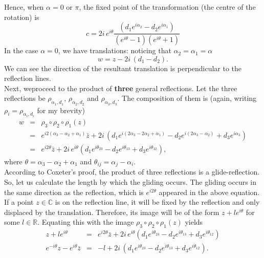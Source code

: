\documentclass{article}
\begin{document}
Hence, when $\alpha = 0$ or $\pi$, the fixed point of the transformation (the centre of the rotation) is
\begin{equation}
c =  2i \, e^{i\theta}\frac{( d_{1} e^{i\alpha_{2}} - d_{2} e^{i\alpha_{1}}) }{(e^{i\theta} - 1)(e^{i\theta} + 1)} \nonumber 
\end{equation}
In the case $\alpha = 0$, we have translations: noticing that $\alpha_{2} = \alpha_{1} = \alpha$ 
\begin{equation}
w = z - 2i \,( d_{1} - d_{2}).
\end{equation}
We can see the direction of the resultant translation is perpendicular to the reflection lines.\\
Next, weproceed to the product of \textbf{three} general reflections. Let the three reflections be $\rho_{\alpha_{1}, d_{1}}$, $\rho_{\alpha_{2},d_{2}}$ and $\rho_{\alpha_{3},d_{3}}$.
The composition of them is (again, writing $\rho_{i} = \rho_{\alpha_{i}, d_{i}}$ for my brevity)
\begin{eqnarray}
w &=& \rho_{3} \circ \rho_{2} \circ \rho_{1} (z) \nonumber \\
  &=& e^{i2(\alpha_{3} - \alpha_{2} + \alpha_{1})} \bar{z} + 2i \, ( d_{1} e^{i(2\alpha_{3} - 2\alpha_{2} + \alpha_{1})} - d_{2} e^{i(2\alpha_{3} - \alpha_{2})} + d_{3} e^{i\alpha_{3}})  \nonumber \\
  &=& e^{i2\theta} \bar{z} + 2i \, e^{i\theta}( d_{1} e^{i\theta_{23}} - d_{2} e^{i\theta_{13}} + d_{3} e^{i\theta_{12}}),
\end{eqnarray}
where $\theta = \alpha_{3} - \alpha_{2} + \alpha_{1}$ and $\theta_{ij} = \alpha_{j} - \alpha_{i}$.\\
According to Coxeter's proof, the product of three reflections is a glide-reflection. So, let us calculate the length by which the gliding occurs.
The gliding occurs in the same direction as the reflection, which is $e^{i2\theta}$ appeared in the above equation.
If a point $z \in \mathbb{C}$ is on the reflection line, it will be fixed by the reflection and only displaced by the translation. 
Therefore, its image will be of the form $z + l e^{i\theta}$ for some $l \in \mathbb{R}$.
Equating this with the image $\rho_{3} \circ \rho_{2} \circ \rho_{1} (z)$ yields
\begin{eqnarray}
\label{eq:gliding-length}
z + l e^{i\theta}  &=& e^{i2\theta} \bar{z} + 2i \, e^{i\theta}( d_{1} e^{i\theta_{23}} - d_{2} e^{i\theta_{13}} + d_{3} e^{i\theta_{12}}) \nonumber \\
e^{-i\theta} z - e^{i\theta} \bar{z}  &=& -l + 2i\,( d_{1} e^{i\theta_{23}} - d_{2} e^{i\theta_{13}} + d_{3} e^{i\theta_{12}}). 
\end{eqnarray}
\end{document}
